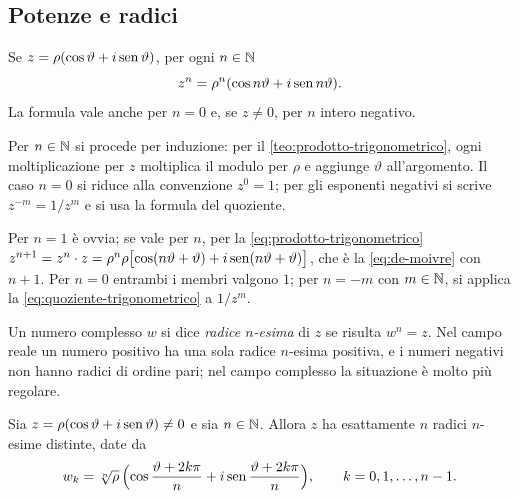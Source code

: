 \subsection{Potenze e radici}

\begin{corollario}\label{cor:de-moivre}
Se $z=\rho(\cos\vartheta+i\operatorname{sen}\vartheta)$, per ogni $n\in\mathbb{N}$
\begin{equation}\label{eq:de-moivre}
  z^{n}=\rho^{n}(\cos n\vartheta+i\operatorname{sen} n\vartheta).
\end{equation}
La formula vale anche per $n=0$ e, se $z\neq0$, per $n$ intero negativo.
\end{corollario}

\begin{schema}
\end{schema}

\begin{strategia}
Per $n\in\mathbb{N}$ si procede per induzione: per il \cref{teo:prodotto-trigonometrico}, ogni
moltiplicazione per $z$ moltiplica il modulo per $\rho$ e aggiunge $\vartheta$
all'argomento. Il caso $n=0$ si riduce alla convenzione $z^{0}=1$; per gli esponenti
negativi si scrive $z^{-m}=1/z^{m}$ e si usa la formula del quoziente.
\end{strategia}

\begin{dimostrazione}
Per $n=1$ è ovvia; se vale per $n$, per la \eqref{eq:prodotto-trigonometrico}
$z^{n+1}=z^{n}\cdot z=\rho^{n}\rho\bigl[\cos(n\vartheta+\vartheta)+i\operatorname{sen}(n\vartheta+\vartheta)\bigr]$,
che è la \eqref{eq:de-moivre} con $n+1$. Per $n=0$ entrambi i membri valgono $1$; per
$n=-m$ con $m\in\mathbb{N}$, si applica la \eqref{eq:quoziente-trigonometrico} a $1/z^{m}$.
\end{dimostrazione}

Un numero complesso $w$ si dice \emph{radice $n$-esima} di $z$ se risulta $w^{n}=z$.
Nel campo reale un numero positivo ha una sola radice $n$-esima positiva, e i numeri
negativi non hanno radici di ordine pari; nel campo complesso la situazione è molto più
regolare.

\begin{teorema}\label{teo:radici-complesse}
Sia $z=\rho(\cos\vartheta+i\operatorname{sen}\vartheta)\neq0$ e sia $n\in\mathbb{N}$. Allora $z$ ha esattamente
$n$ radici $n$-esime distinte, date da
\begin{equation}\label{eq:radici-complesse}
  w_{k}=\sqrt[n]{\rho}\,\Bigl(\cos\frac{\vartheta+2k\pi}{n}+i\operatorname{sen}\frac{\vartheta+2k\pi}{n}\Bigr),
  \qquad k=0,1,\dots,n-1.
\end{equation}
\end{teorema}

